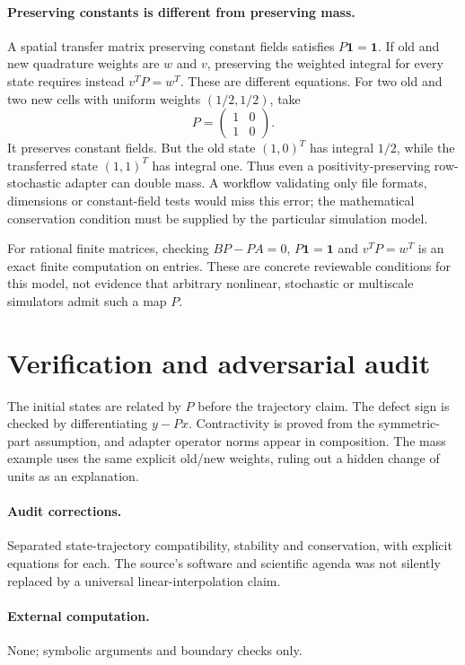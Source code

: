 \documentclass[11pt]{article}
\begin{document}
\paragraph{Preserving constants is different from preserving mass.}
A spatial transfer matrix preserving constant fields satisfies
$P\mathbf1=\mathbf1$. If old and new quadrature weights are $w$ and $v$,
preserving the weighted integral for every state requires instead
$v^TP=w^T$. These are different equations.
For two old and two new cells with uniform weights $(1/2,1/2)$, take
\[
 P=\begin{pmatrix}1&0\\1&0\end{pmatrix}.
\]
It preserves constant fields. But the old state $(1,0)^T$ has integral $1/2$,
while the transferred state $(1,1)^T$ has integral one.
Thus even a positivity-preserving row-stochastic adapter can double mass.
A workflow validating only file formats, dimensions or constant-field tests would
miss this error; the mathematical conservation condition must be supplied by
the particular simulation model.

For rational finite matrices, checking $BP-PA=0$, $P\mathbf1=\mathbf1$
and $v^TP=w^T$ is an exact finite computation on entries. These are concrete
reviewable conditions for this model, not evidence that arbitrary nonlinear,
stochastic or multiscale simulators admit such a map $P$.

\section{Verification and adversarial audit}

The initial states are related by $P$ before the trajectory claim. The defect
sign is checked by differentiating $y-Px$. Contractivity is proved from the
symmetric-part assumption, and adapter operator norms appear in composition.
The mass example uses the same explicit old/new weights, ruling out a hidden
change of units as an explanation.

\paragraph{Audit corrections.} Separated state-trajectory compatibility, stability and conservation, with
explicit equations for each. The source's software and scientific agenda was not
silently replaced by a universal linear-interpolation claim.
\paragraph{External computation.} None; symbolic arguments and boundary checks only.
\end{document}
